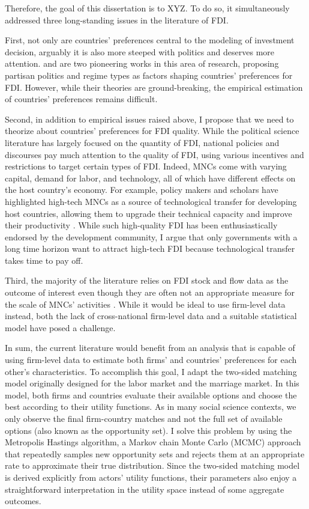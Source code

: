 Therefore, the goal of this dissertation is to XYZ. To do so, it simultaneously
addressed three long-standing issues in the literature of FDI.

First, not only are countries' preferences central
to the modeling of investment decision, arguably it is also more steeped with
politics and deserves more attention. \citet{Pinto2013} and \citet{Pandya2016}
are two pioneering works in this area of research, proposing partisan politics
and regime types as factors shaping countries' preferences for FDI. However,
while their theories are ground-breaking, the empirical estimation of countries'
preferences remains difficult.

Second, in addition to empirical issues raised above, I propose that we need to
theorize about countries' preferences for FDI quality. While the political
science literature has largely focused on the quantity of FDI, national policies
and discourses pay much attention to the quality of FDI, using various
incentives and restrictions to target certain types of FDI. Indeed, MNCs come
with varying capital, demand for labor, and technology, all of which have
different effects on the host country's economy. For example, policy makers and
scholars have highlighted high-tech MNCs as a source of technological transfer
for developing host countries, allowing them to upgrade their technical capacity
and improve their productivity \citep{Findlay1978, Nunnenkamp2004}. While such
high-quality FDI has been enthusiastically endorsed by the development
community, I argue that only governments with a long time horizon want to
attract high-tech FDI because technological transfer takes time to pay off.

Third, the majority of the literature relies on FDI stock
and flow data as the outcome of interest even though they are often not an
appropriate measure for the scale of MNCs' activities \citep{Kerner2014}. While
it would be ideal to use firm-level data instead, both the lack of
cross-national firm-level data and a suitable statistical model have posed a
challenge. 

In sum, the current literature would benefit from an analysis that is capable of
using firm-level data to estimate both firms' and countries' preferences for
each other's characteristics. To accomplish this goal, I adapt the two-sided
matching model originally designed for the labor market and the marriage market.
In this model, both firms and countries evaluate their available options and
choose the best according to their utility functions. As in many social science
contexts, we only observe the final firm-country matches and not the full set of
available options (also known as the opportunity set). I solve this problem by
using the Metropolis Hastings algorithm, a Markov chain Monte Carlo (MCMC)
approach that repeatedly samples new opportunity sets and rejects them at an
appropriate rate to approximate their true distribution. Since the two-sided
matching model is derived explicitly from actors' utility functions, their
parameters also enjoy a straightforward interpretation in the utility space
instead of some aggregate outcomes.

